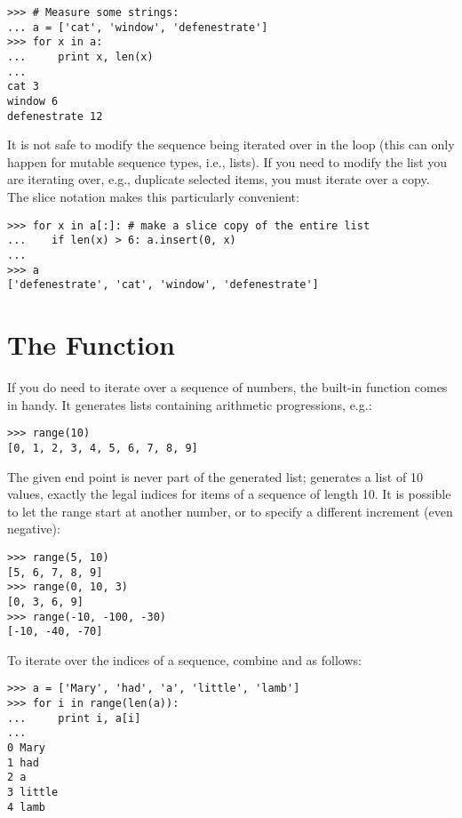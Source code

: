 \documentclass{manual}
\begin{document}
\begin{verbatim}
>>> # Measure some strings:
... a = ['cat', 'window', 'defenestrate']
>>> for x in a:
...     print x, len(x)
... 
cat 3
window 6
defenestrate 12
\end{verbatim}

It is not safe to modify the sequence being iterated over in the loop
(this can only happen for mutable sequence types, i.e., lists).  If
you need to modify the list you are iterating over, e.g., duplicate
selected items, you must iterate over a copy.  The slice notation
makes this particularly convenient:

\begin{verbatim}
>>> for x in a[:]: # make a slice copy of the entire list
...    if len(x) > 6: a.insert(0, x)
... 
>>> a
['defenestrate', 'cat', 'window', 'defenestrate']
\end{verbatim}


\section{The  Function \label{range}}

If you do need to iterate over a sequence of numbers, the built-in
function  comes in handy.  It generates lists
containing arithmetic progressions, e.g.:

\begin{verbatim}
>>> range(10)
[0, 1, 2, 3, 4, 5, 6, 7, 8, 9]
\end{verbatim}

The given end point is never part of the generated list;
 generates a list of 10 values, exactly the legal
indices for items of a sequence of length 10.  It is possible to let
the range start at another number, or to specify a different increment
(even negative):

\begin{verbatim}
>>> range(5, 10)
[5, 6, 7, 8, 9]
>>> range(0, 10, 3)
[0, 3, 6, 9]
>>> range(-10, -100, -30)
[-10, -40, -70]
\end{verbatim}

To iterate over the indices of a sequence, combine 
and  as follows:

\begin{verbatim}
>>> a = ['Mary', 'had', 'a', 'little', 'lamb']
>>> for i in range(len(a)):
...     print i, a[i]
... 
0 Mary
1 had
2 a
3 little
4 lamb
\end{verbatim}
\end{document}
